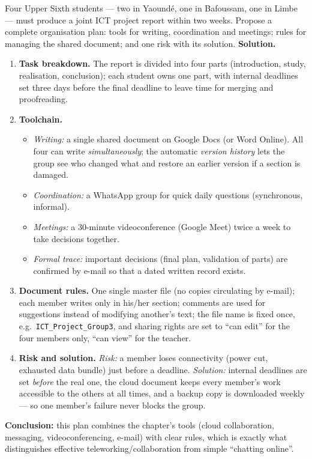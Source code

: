 \documentclass[11pt]{article}
\begin{document}
\begin{exoresolu}
Four Upper Sixth students --- two in Yaoundé, one in Bafoussam, one in Limbe --- must produce a joint ICT project report within two weeks. Propose a complete organisation plan: tools for writing, coordination and meetings; rules for managing the shared document; and one risk with its solution.
\tcblower
\textbf{Solution.}
\begin{enumerate}
\item \textbf{Task breakdown.} The report is divided into four parts (introduction, study, realisation, conclusion); each student owns one part, with internal deadlines set three days before the final deadline to leave time for merging and proofreading.
\item \textbf{Toolchain.}
\begin{itemize}
\item \emph{Writing:} a single shared document on Google Docs (or Word Online). All four can write \emph{simultaneously}; the automatic \emph{version history} lets the group see who changed what and restore an earlier version if a section is damaged.
\item \emph{Coordination:} a WhatsApp group for quick daily questions (synchronous, informal).
\item \emph{Meetings:} a 30-minute videoconference (Google Meet) twice a week to take decisions together.
\item \emph{Formal trace:} important decisions (final plan, validation of parts) are confirmed by e-mail so that a dated written record exists.
\end{itemize}
\item \textbf{Document rules.} One single master file (no copies circulating by e-mail); each member writes only in his/her section; comments are used for suggestions instead of modifying another's text; the file name is fixed once, e.g.\ \texttt{ICT\_Project\_Group3}, and sharing rights are set to ``can edit'' for the four members only, ``can view'' for the teacher.
\item \textbf{Risk and solution.} \emph{Risk:} a member loses connectivity (power cut, exhausted data bundle) just before a deadline. \emph{Solution:} internal deadlines are set \emph{before} the real one, the cloud document keeps every member's work accessible to the others at all times, and a backup copy is downloaded weekly --- so one member's failure never blocks the group.
\end{enumerate}
\textbf{Conclusion:} this plan combines the chapter's tools (cloud collaboration, messaging, videoconferencing, e-mail) with clear rules, which is exactly what distinguishes effective teleworking/collaboration from simple ``chatting online''.
\end{exoresolu}
\end{document}
